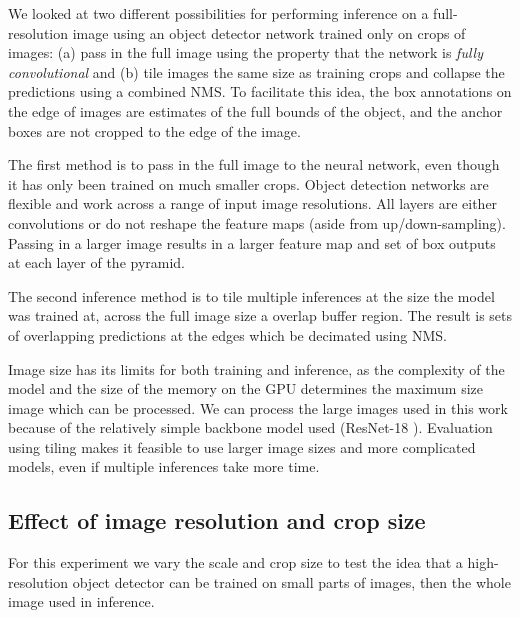 \documentclass[conference]{IEEEtran}
\begin{document}
We looked at two different possibilities for performing inference on a full-resolution image using an object detector network trained only on crops of images: (a) pass in the full image using the property that the network is \emph{fully convolutional} and (b) tile images the same size as training crops and collapse the predictions using a combined \gls{NMS}. To facilitate this idea, the box annotations on the edge of images are estimates of the full bounds of the object, and the anchor boxes are not cropped to the edge of the image. 

The first method is to pass in the full image to the neural network, even though it has only been trained on much smaller crops. Object detection networks are flexible and work across a range of input image resolutions. All layers are either convolutions or do not reshape the feature maps (aside from up/down-sampling). Passing in a larger image results in a larger feature map and set of box outputs at each layer of the pyramid. 

The second inference method is to tile multiple inferences at the size the model was trained at, across the full image size a overlap buffer region. The result is sets of overlapping predictions at the edges which be decimated using \gls{NMS}. 

Image size has its limits for both training and inference, as the complexity of the model and the size of the memory on the \gls{GPU} determines the maximum size image which can be processed. We can process the large images used in this work because of the relatively simple backbone model used (ResNet-18 \cite{He}). Evaluation using tiling makes it feasible to use larger image sizes and more complicated models, even if multiple inferences take more time.


\subsection {Effect of image resolution and crop size}
\label{sec:scale_crop}

For this experiment we vary the scale and crop size to test the idea that a high-resolution object detector can be trained on small parts of images, then the whole image used in inference.
\end{document}
